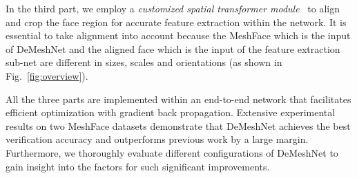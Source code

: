 \documentclass[10pt,twocolumn,letterpaper]{article}
\begin{document}




In the third part, we employ a \textit{customized spatial transformer module}~\cite{jaderberg2015spatial} to align and crop the face region for accurate feature extraction within the network. It is essential to take alignment into account because the MeshFace which is the input of DeMeshNet and the aligned face which is the input of the feature extraction sub-net are different in sizes, scales and orientations (as shown in Fig.~\ref{fig:overview}).


All the three parts are implemented within an end-to-end network that facilitates efficient optimization with gradient back propagation. Extensive experimental results on two MeshFace datasets demonstrate that DeMeshNet achieves the best verification accuracy and outperforms previous work by a large margin.
Furthermore, we thoroughly evaluate different configurations of DeMeshNet to gain insight into the factors for such significant improvements.


\end{document}
